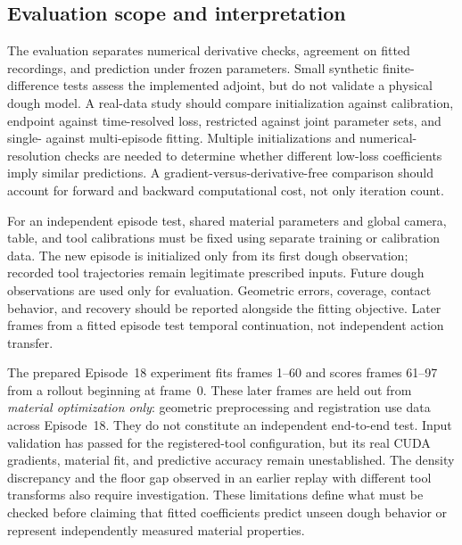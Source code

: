 \subsection{Evaluation scope and interpretation}

The evaluation separates numerical derivative checks, agreement on fitted recordings, and prediction under frozen parameters. Small synthetic finite-difference tests assess the implemented adjoint, but do not validate a physical dough model. A real-data study should compare initialization against calibration, endpoint against time-resolved loss, restricted against joint parameter sets, and single- against multi-episode fitting. Multiple initializations and numerical-resolution checks are needed to determine whether different low-loss coefficients imply similar predictions. A gradient-versus-derivative-free comparison should account for forward and backward computational cost, not only iteration count.

For an independent episode test, shared material parameters and global camera, table, and tool calibrations must be fixed using separate training or calibration data. The new episode is initialized only from its first dough observation; recorded tool trajectories remain legitimate prescribed inputs. Future dough observations are used only for evaluation. Geometric errors, coverage, contact behavior, and recovery should be reported alongside the fitting objective. Later frames from a fitted episode test temporal continuation, not independent action transfer.

The prepared Episode~18 experiment fits frames 1--60 and scores frames 61--97 from a rollout beginning at frame~0. These later frames are held out from \emph{material optimization only}: geometric preprocessing and registration use data across Episode~18. They do not constitute an independent end-to-end test. Input validation has passed for the registered-tool configuration, but its real CUDA gradients, material fit, and predictive accuracy remain unestablished. The density discrepancy and the floor gap observed in an earlier replay with different tool transforms also require investigation. These limitations define what must be checked before claiming that fitted coefficients predict unseen dough behavior or represent independently measured material properties.
